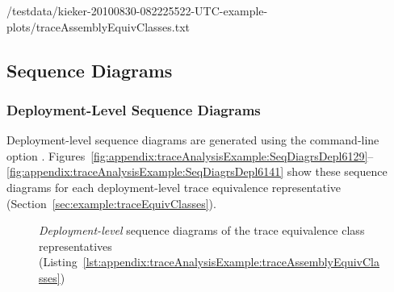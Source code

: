 \setTextListing
%
{\aspectJBookstoreApplicationDir/testdata/kieker-20100830-082225522-UTC-example-plots/traceAssemblyEquivClasses.txt}

\pagebreak

\subsection{Sequence Diagrams}\label{sec:example:seqDiagrams}%

\subsubsection{Deployment-Level Sequence Diagrams}\label{sec:example:deploymentSeqDiagrams}%

Deployment-level sequence diagrams are generated using the command-line option \OPT{\OPTplotDeploymentSequenceDiagrams}. %
Figures~\ref{fig:appendix:traceAnalysisExample:SeqDiagrsDepl6129}--\ref{fig:appendix:traceAnalysisExample:SeqDiagrsDepl6141} %
show these sequence diagrams for each deployment-level %
trace equivalence representative (Section~\ref{sec:example:traceEquivClasses}).

\begin{figure}[h]\centering
{}
\caption{\textit{Deployment-level} sequence diagrams of the trace %
equivalence class representatives (Listing~\ref{lst:appendix:traceAnalysisExample:traceAssemblyEquivClasses})}
\label{fig:appendix:traceAnalysisExample:SeqDiagrsDepl}
\end{figure}

